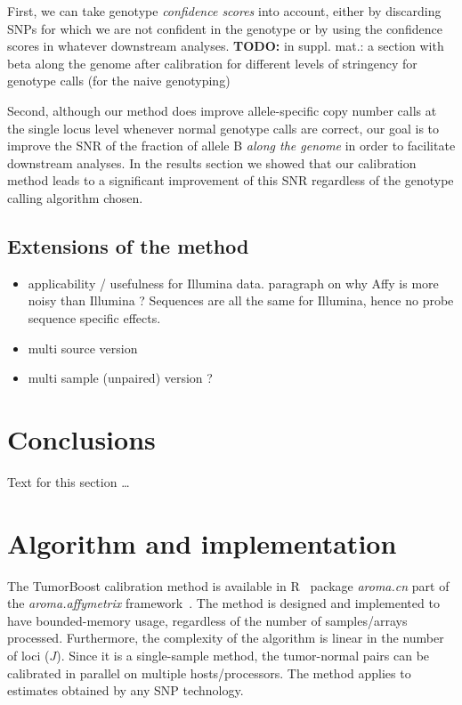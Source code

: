 \documentclass[10pt]{bmc_article}
\newenvironment{bmcformat}{\fussy\setboolean{publ}{true}}{\fussy}
\newcommand{\pkg}[1]{\textit{#1}\xspace}
\newenvironment{TODO}{\color{red}\textbf{TODO:}}{}
\begin{document}
\begin{bmcformat}
First, we can take genotype \emph{confidence scores} into account, either by discarding SNPs for which we are not confident in the genotype or by  using the confidence scores in whatever downstream analyses. 
\begin{TODO}
  in suppl. mat.: a section with beta along the genome after calibration for different levels of stringency for genotype calls (for the naive genotyping)
\end{TODO}

Second, although our method does improve allele-specific copy number calls at the single locus level whenever normal genotype calls are correct, our goal is to improve the SNR of the fraction of allele B \emph{along the genome} in order to facilitate downstream analyses. In the results section we showed that our calibration method leads to a significant improvement of this SNR regardless of the genotype calling algorithm chosen. 

\subsection*{Extensions of the method}
\begin{itemize}
\item applicability / usefulness for Illumina data. paragraph on why Affy is more noisy than Illumina ? Sequences are all the same for Illumina, hence no probe sequence specific effects.
\item multi source version
\item multi sample (unpaired) version ?
\end{itemize}

    

\section*{Conclusions}
  Text for this section \ldots


\section*{Algorithm and implementation}
The TumorBoost calibration method is available in R~\cite{RDevel_2008} package \pkg{aroma.cn} part of the \pkg{aroma.affymetrix} framework~\cite{BengtssonH_etal_2008b}.  The  method is designed and implemented to have bounded-memory usage, regardless of the number of samples/arrays processed. 
Furthermore, the complexity of the algorithm is linear in the number of loci ($J$).
Since it is a single-sample method, the tumor-normal pairs can be calibrated in parallel on multiple hosts/processors.
The method applies to estimates obtained by any SNP technology.





\end{bmcformat}
\end{document}
